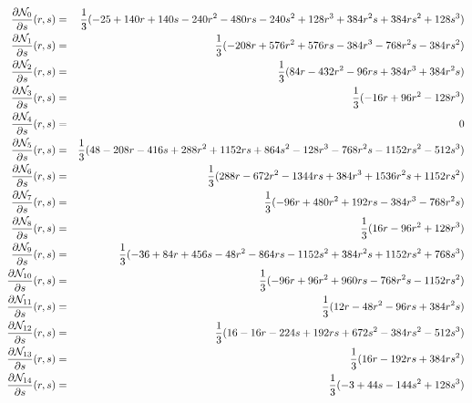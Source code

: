 \begin{eqnarray}
\frac{\partial{\mathcal{N}}_0}{\partial s} (r,s) &=& \frac13 ( -25+140r+140s 
-240r^2-480rs-240s^2+128 r^3 + 384 r^2s + 384 rs^2 + 128 s^3 ) \nonumber\\
\frac{\partial{\mathcal{N}}_1}{\partial s} (r,s) &=& \frac13 ( -208r +576r^2+576rs-384r^3-768r^2s-384rs^2)\nonumber\\
\frac{\partial{\mathcal{N}}_2}{\partial s} (r,s) &=& \frac13(84r-432r^2-96rs+384r^3+384r^2s)\nonumber\\
\frac{\partial{\mathcal{N}}_3}{\partial s} (r,s) &=& \frac13(-16r+96r^2-128r^3)\nonumber\\
\frac{\partial{\mathcal{N}}_4}{\partial s} (r,s) &=& 0\nonumber\\
\frac{\partial{\mathcal{N}}_5}{\partial s} (r,s) &=& \frac13(48-208r-416s+288r^2+1152rs+864s^2-128r^3-768r^2s-1152rs^2-512s^3)\nonumber\\
\frac{\partial{\mathcal{N}}_6}{\partial s} (r,s) &=& \frac13(288r-672r^2-1344rs+384r^3+1536r^2s+1152rs^2)\nonumber\\
\frac{\partial{\mathcal{N}}_7}{\partial s} (r,s) &=& \frac13(-96r+480r^2+192rs-384r^3-768r^2s)\nonumber\\
\frac{\partial{\mathcal{N}}_8}{\partial s} (r,s) &=& \frac13(16r-96r^2+128r^3)\nonumber\\
\frac{\partial{\mathcal{N}}_9}{\partial s} (r,s) &=& \frac13(-36+84r+456s-48r^2-864rs-1152s^2+384r^2s+1152rs^2+768s^3)\nonumber\\
\frac{\partial{\mathcal{N}}_{10}}{\partial s} (r,s) &=& \frac13(-96r+96r^2+960rs-768r^2s-1152rs^2)\nonumber\\
\frac{\partial{\mathcal{N}}_{11}}{\partial s} (r,s) &=& \frac13(12r-48r^2-96rs+384r^2s)\nonumber\\
\frac{\partial{\mathcal{N}}_{12}}{\partial s} (r,s) &=& \frac13(16-16r-224s+192rs+672s^2-384rs^2-512s^3)\nonumber\\
\frac{\partial{\mathcal{N}}_{13}}{\partial s} (r,s) &=& \frac13(16r-192rs+384rs^2)\nonumber\\
\frac{\partial{\mathcal{N}}_{14}}{\partial s} (r,s) &=& \frac13(-3+44s-144s^2+128s^3)\nonumber
\end{eqnarray}







